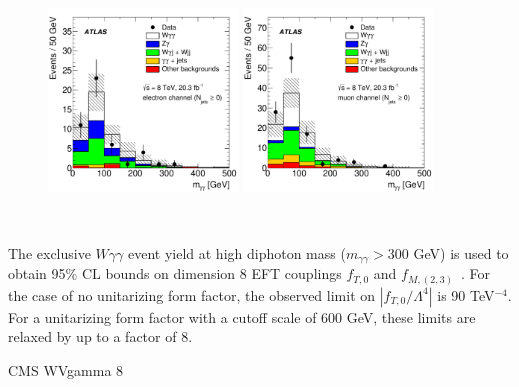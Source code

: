 \begin{figure}[p]
    \centering
    \includegraphics[width=0.45\textwidth]{figures/ss-inclboson-triboson-wgg-ele-atlas8tev.pdf}
    \includegraphics[width=0.45\textwidth]{figures/ss-inclboson-triboson-wgg-mu-atlas8tev.pdf}
    \caption{~\cite{Aad:2015uqa}}
    \label{fig:ss-inclboson-triboson-wgg-atlas8tev}
\end{figure}

The exclusive $W\gamma\gamma$ event yield at high diphoton mass
($m_{\gamma\gamma} > 300$ GeV) is used to obtain 95\% CL bounds on
dimension 8 EFT couplings $f_{T,0}$ and
$f_{M,(2,3)}$~\cite{Eboli:2006wa}.  For the case of no unitarizing
form factor, the observed limit on $|f_{T,0}/\Lambda^4|$ is 90
TeV$^{-4}$.  For a unitarizing form factor with a cutoff scale of 600
GeV, these limits are relaxed by up to a factor of 8.

CMS WVgamma 8 \TeV~\cite{Chatrchyan:2014bza}

